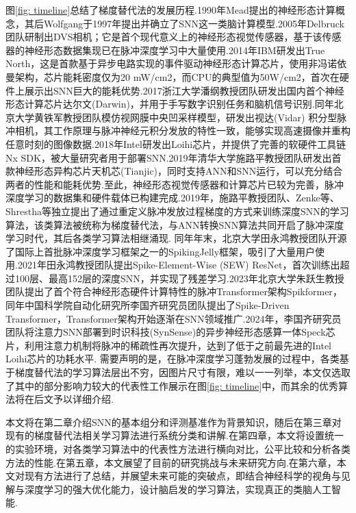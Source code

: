 \documentclass{SCIS2020cn}
\begin{document}
图\ref{fig: timeline}总结了梯度替代法的发展历程.1990年Mead提出的神经形态计算概念\cite{mead1990neuromorphic}，其后Wolfgang于1997年提出并确立了SNN这一类脑计算模型\cite{maass1997networks}.2005年Delbruck团队研制出DVS相机\cite{lichtsteiner2008128}；它是首个现代意义上的神经形态视觉传感器，基于该传感器的神经形态数据集现已在脉冲深度学习中大量使用.2014年IBM研发出True North\cite{merolla2014million}，这是首款基于异步电路实现的事件驱动神经形态计算芯片，使用非冯诺依曼架构，芯片能耗密度仅为20 mW/cm2，而CPU的典型值为50W/cm2，首次在硬件上展示出SNN巨大的能耗优势.2017浙江大学潘纲教授团队研发出国内首个神经形态计算芯片达尔文(Darwin)\cite{ma2017darwin}，并用于手写数字识别任务和脑机信号识别.同年北京大学黄铁军教授团队模仿视网膜中央凹采样模型，研发出视达(Vidar)\cite{dong2017spike} 积分型脉冲相机，其工作原理与脉冲神经元积分发放的特性一致，能够实现高速摄像并重构任意时刻的图像数据.2018年Intel研发出Loihi芯片，并提供了完善的软硬件工具链Nx SDK，被大量研究者用于部署SNN.2019年清华大学施路平教授团队研发出首款神经形态异构芯片天机芯(Tianjic)\cite{pei2019towards}，同时支持ANN和SNN运行，可以充分结合两者的性能和能耗优势.至此，神经形态视觉传感器和计算芯片已较为完善，脉冲深度学习的数据集和硬件载体已构建完成.2019年，施路平教授团队\cite{wu2018STBP}、Zenke等\cite{10.1162/neco_a_01086}、Shrestha等\cite{shrestha2018slayer}独立提出了通过重定义脉冲发放过程梯度的方式来训练深度SNN的学习算法，该类算法被统称为梯度替代法，与ANN转换SNN算法共同开启了脉冲深度学习时代，其后各类学习算法相继涌现.
同年年末，北京大学田永鸿教授团队开源了国际上首批脉冲深度学习框架之一的SpikingJelly框架\cite{doi:10.1126/sciadv.adi1480}，吸引了大量用户使用.2021年田永鸿教授团队提出Spike-Element-Wise (SEW) ResNet\cite{SEWResNet}，首次训练出超过100层、最高152层的深度SNN，并实现了残差学习.2023年北京大学朱跃生教授团队提出了首个符合神经形态硬件计算特性的脉冲Transformer架构Spikformer\cite{zhou2023spikformer}，同年中国科学院自动化研究所李国齐研究员团队提出了Spike-Driven Transformer\cite{NEURIPS2023_ca0f5358}，Transformer架构开始逐渐在SNN领域推广.2024年，李国齐研究员团队将注意力SNN部署到时识科技(SynSense)的异步神经形态感算一体Speck芯片\cite{Yao2024}，利用注意力机制将脉冲的稀疏性再次提升，达到了低于之前最先进的Intel Loihi芯片的功耗水平.
需要声明的是，在脉冲深度学习蓬勃发展的过程中，各类基于梯度替代法的学习算法层出不穷，因图片尺寸有限，难以一一列举，本文仅选取了其中的部分影响力较大的代表性工作展示在图\ref{fig: timeline}中，而其余的优秀算法将在后文予以详细介绍.

本文将在第二章介绍SNN的基本组分和评测基准作为背景知识，随后在第三章对现有的梯度替代法相关学习算法进行系统分类和讲解.在第四章，本文将设置统一的实验环境，对各类学习算法中的代表性方法进行横向对比，公平比较和分析各类方法的性能.在第五章，本文展望了目前的研究挑战与未来研究方向.在第六章，本文对现有方法进行了总结，并展望未来可能的突破点，即结合神经科学的视角与见解与深度学习的强大优化能力，设计脑启发的学习算法，实现真正的类脑人工智能.
\end{document}
